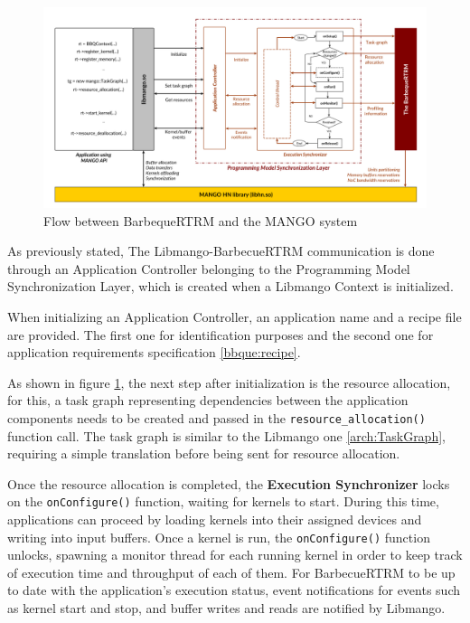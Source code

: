 \begin{figure}[ht]
    \centering
    \includegraphics[width=\textwidth]{img/barbeque-flow.png}
    \captionsetup{justification=centering}
    \caption{Flow between BarbequeRTRM and the MANGO system}
    \label{fig:barbecue-flow}
\end{figure}

As previously stated, The Libmango-BarbecueRTRM communication is done through an Application Controller belonging to the Programming Model Synchronization Layer, which is created when a Libmango Context is initialized.

When initializing an Application Controller, an application name and a recipe file are provided. The first one for identification purposes and the second one for application requirements specification \ref{bbque:recipe}.

As shown in figure \ref{fig:barbecue-flow}, the next step after initialization is the resource allocation, for this, a task graph representing dependencies between the application components needs to be created and passed in the \texttt{resource\_allocation()} function call. The task graph is similar to the Libmango one \ref{arch:TaskGraph}, requiring a simple translation before being sent for resource allocation. 

Once the resource allocation is completed, the \textbf{Execution Synchronizer} locks on the \texttt{onConfigure()} function, waiting for kernels to start. During this time, applications can proceed by loading kernels into their assigned devices and writing into input buffers. Once a kernel is run, the \texttt{onConfigure()} function unlocks, spawning a monitor thread for each running kernel in order to keep track of execution time and throughput of each of them. 
For BarbecueRTRM to be up to date with the application's execution status, event notifications for events such as kernel start and stop, and buffer writes and reads are notified by Libmango.

